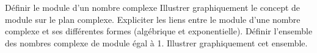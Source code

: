 %
%
	\begin{tasks}
		\task Définir le module d'un nombre complexe
		\task Illustrer graphiquement le concept de module sur le plan complexe.
		\task Expliciter les liens entre le module d'une nombre complexe et ses différentes formes (algébrique et exponentielle).
		\task Définir l'ensemble des nombres complexe de module égal à 1. Illustrer graphiquement cet ensemble.
	\end{tasks}
